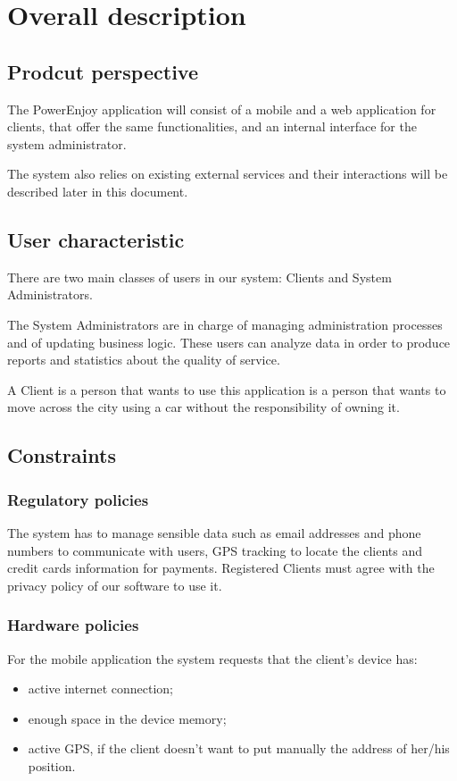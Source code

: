 \chapter{Overall description}

\section{Prodcut perspective}
The PowerEnjoy application will consist of a mobile and a web application for clients, that offer the same functionalities, and an internal interface for the system administrator.

The system also relies on existing external services and their interactions will be described later in this document.

\section{User characteristic}
There are two main classes of users in our system: Clients and System Administrators.

The System Administrators are in charge of managing administration processes and of updating business logic. These users can analyze data in order to produce reports and statistics about the quality of service.

A Client is a person that wants to use this application is a person that wants to move across the city using a car without the responsibility of owning it.

\section{Constraints}

\subsection{Regulatory policies}

The system has to manage sensible data such as email addresses and phone numbers to communicate with users, GPS tracking to locate the clients and credit cards information for payments.
Registered Clients must agree with the privacy policy of our software to use it.

\subsection{Hardware policies}
For the mobile application the system requests that the client’s device has:
\begin{itemize}
\item active internet connection;
\item enough space in the device memory;
\item active GPS, if the client doesn’t want to put manually the address of her/his position.
\end{itemize}

